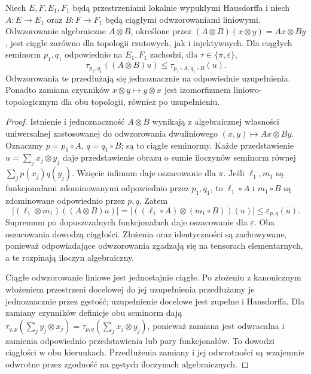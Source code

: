 \begin{stwierdzenie}
\label{prop:dt-tensor-functoriality}
Niech $E,F,E_1,F_1$ będą przestrzeniami lokalnie
wypukłymi Hausdorffa i niech $A:E\to E_1$ oraz
$B:F\to F_1$ będą ciągłymi odwzorowaniami liniowymi.
Odwzorowanie algebraiczne $A\otimes B$, określone przez
$(A\otimes B)(x\otimes y)=Ax\otimes By$, jest ciągłe
zarówno dla topologii rzutowych, jak i injektywnych.
Dla ciągłych seminorm $p_1,q_1$ odpowiednio na $E_1,F_1$
zachodzi, dla $\tau\in\{\pi,\varepsilon\}$,
\[
 \tau_{p_1,q_1}((A\otimes B)u)
 \le\tau_{p_1\circ A,q_1\circ B}(u).
\]
Odwzorowania te przedłużają się jednoznacznie na
odpowiednie uzupełnienia. Ponadto zamiana czynników
$x\otimes y\mapsto y\otimes x$ jest izomorfizmem
liniowo-topologicznym dla obu topologii, również
po uzupełnieniu.
\end{stwierdzenie}
\begin{proof}
Istnienie i jednoznaczność $A\otimes B$ wynikają
z algebraicznej własności uniwersalnej zastosowanej
do odwzorowania dwuliniowego $(x,y)\mapsto Ax\otimes By$.
Oznaczmy $p=p_1\circ A$, $q=q_1\circ B$; są to
ciągłe seminormy. Każde przedstawienie
$u=\sum_j x_j\otimes y_j$ daje przedstawienie obrazu
o sumie iloczynów seminorm równej $\sum_jp(x_j)q(y_j)$.
Wzięcie infimum daje oszacowanie dla $\pi$.
Jeśli $\ell_1,m_1$ są funkcjonałami zdominowanymi
odpowiednio przez $p_1,q_1$, to $\ell_1\circ A$
i $m_1\circ B$ są zdominowane odpowiednio przez $p,q$.
Zatem
\[
 |(\ell_1\otimes m_1)((A\otimes B)u)|
 =|((\ell_1\circ A)\otimes(m_1\circ B))(u)|
 \le\varepsilon_{p,q}(u).
\]
Supremum po dopuszczalnych funkcjonałach daje
oszacowanie dla $\varepsilon$. Oba oszacowania
dowodzą ciągłości. Złożenia oraz identyczności
są zachowywane, ponieważ odpowiadające odwzorowania
zgadzają się na tensorach elementarnych, a te
rozpinają iloczyn algebraiczny.

Ciągłe odwzorowanie liniowe jest jednostajnie ciągłe.
Po złożeniu z kanonicznym włożeniem przestrzeni
docelowej do jej uzupełnienia przedłużamy je
jednoznacznie przez gęstość; uzupełnienie docelowe
jest zupełne i Hausdorffa.
Dla zamiany czynników definicje obu seminorm dają
$\tau_{q,p}(\sum_jy_j\otimes x_j)
=\tau_{p,q}(\sum_jx_j\otimes y_j)$, ponieważ zamiana
jest odwracalna i zamienia odpowiednio przedstawienia
lub pary funkcjonałów. To dowodzi ciągłości w obu
kierunkach. Przedłużenia zamiany i jej odwrotności
są wzajemnie odwrotne przez zgodność na gęstych
iloczynach algebraicznych.
\end{proof}

